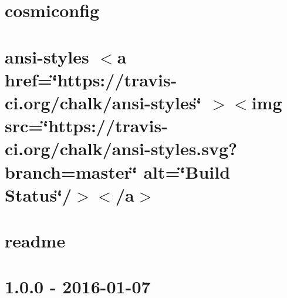 \documentclass[twoside]{book}
\newcommand{\+}{\discretionary{\mbox{\scriptsize$\hookleftarrow$}}{}{}}
\begin{document}
\chapter{cosmiconfig}
\label{md__c___users_vaishnavi_jadhav__desktop__developer_code_mean_stack_example_client_node_modules_cosmiconfig__r_e_a_d_m_e}

\chapter{ansi-\/styles \texorpdfstring{$<$}{<}a href=\char`\"{}https\+://travis-\/ci.\+org/chalk/ansi-\/styles\char`\"{} \texorpdfstring{$>$}{>}\texorpdfstring{$<$}{<}img src=\char`\"{}https\+://travis-\/ci.\+org/chalk/ansi-\/styles.\+svg?branch=master\char`\"{} alt=\char`\"{}\+Build Status\char`\"{}/\texorpdfstring{$>$}{>}\texorpdfstring{$<$}{<}/a\texorpdfstring{$>$}{>}}
\label{md__c___users_vaishnavi_jadhav__desktop__developer_code_mean_stack_example_client_node_modules_c0a63aa23191bafed3da3b9a427a15b36}

\chapter{readme}
\label{md__c___users_vaishnavi_jadhav__desktop__developer_code_mean_stack_example_client_node_modules_cd37dac9f81424255a59708283f042be9}

\chapter{1.0.0 -\/ 2016-\/01-\/07}
\label{md__c___users_vaishnavi_jadhav__desktop__developer_code_mean_stack_example_client_node_modules_cf64f589ccf3f51518ecd72210a54209b}

\end{document}
